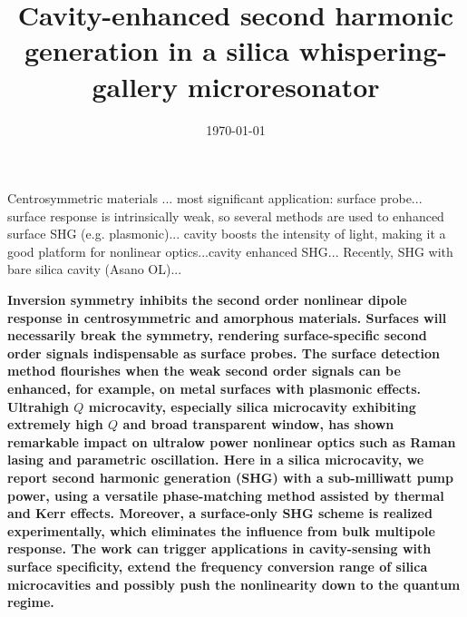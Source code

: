 \documentclass[a4paper,8pt,hyperref, twocolumn]{article}
\title{\bfseries \Large Cavity-enhanced second harmonic generation in a silica whispering-gallery microresonator}
\date{\normalsize \today}
\begin{document}
\maketitle



Centrosymmetric materials ... most significant application: surface probe... surface response is intrinsically weak, so several methods are used to enhanced surface SHG (e.g. plasmonic)... cavity boosts the intensity of light, making it a good platform for nonlinear optics...cavity enhanced SHG... Recently, SHG with bare silica cavity (Asano OL)...

\textbf{Inversion symmetry inhibits the second order nonlinear dipole response in centrosymmetric and amorphous materials.
 Surfaces will necessarily break the symmetry, rendering surface-specific second order signals indispensable as surface probes. 
The surface detection method flourishes when the weak second order signals can be enhanced, for example, on metal surfaces with plasmonic effects. 
Ultrahigh $Q$ microcavity, especially silica microcavity exhibiting extremely high $Q$ and broad transparent window, has shown remarkable impact on ultralow power nonlinear optics such as Raman lasing and parametric oscillation. 
Here in a silica microcavity, we report second harmonic generation (SHG) with a sub-milliwatt pump power, using a versatile phase-matching method assisted by thermal and Kerr effects.
Moreover, a surface-only SHG scheme is realized experimentally, which eliminates the influence from bulk multipole response.
The work can trigger applications in cavity-sensing with surface specificity, extend the frequency conversion range of silica microcavities and possibly push the nonlinearity down to the quantum regime.
}
\end{document}
